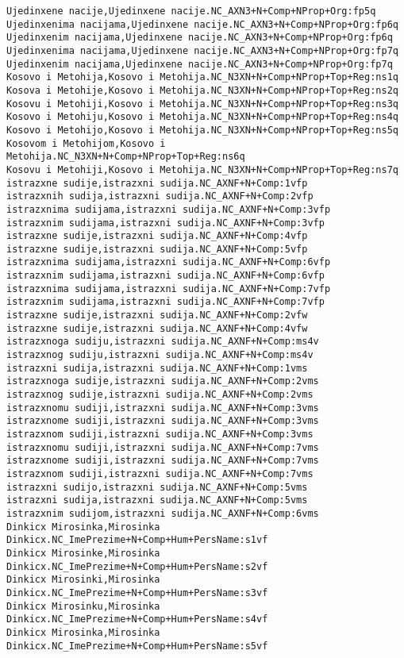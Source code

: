 \begin{verbatim}
Ujedinxene nacije,Ujedinxene nacije.NC_AXN3+N+Comp+NProp+Org:fp5q
Ujedinxenima nacijama,Ujedinxene nacije.NC_AXN3+N+Comp+NProp+Org:fp6q
Ujedinxenim nacijama,Ujedinxene nacije.NC_AXN3+N+Comp+NProp+Org:fp6q
Ujedinxenima nacijama,Ujedinxene nacije.NC_AXN3+N+Comp+NProp+Org:fp7q
Ujedinxenim nacijama,Ujedinxene nacije.NC_AXN3+N+Comp+NProp+Org:fp7q
Kosovo i Metohija,Kosovo i Metohija.NC_N3XN+N+Comp+NProp+Top+Reg:ns1q
Kosova i Metohije,Kosovo i Metohija.NC_N3XN+N+Comp+NProp+Top+Reg:ns2q
Kosovu i Metohiji,Kosovo i Metohija.NC_N3XN+N+Comp+NProp+Top+Reg:ns3q
Kosovo i Metohiju,Kosovo i Metohija.NC_N3XN+N+Comp+NProp+Top+Reg:ns4q
Kosovo i Metohijo,Kosovo i Metohija.NC_N3XN+N+Comp+NProp+Top+Reg:ns5q
Kosovom i Metohijom,Kosovo i Metohija.NC_N3XN+N+Comp+NProp+Top+Reg:ns6q
Kosovu i Metohiji,Kosovo i Metohija.NC_N3XN+N+Comp+NProp+Top+Reg:ns7q
istrazxne sudije,istrazxni sudija.NC_AXNF+N+Comp:1vfp
istrazxnih sudija,istrazxni sudija.NC_AXNF+N+Comp:2vfp
istrazxnima sudijama,istrazxni sudija.NC_AXNF+N+Comp:3vfp
istrazxnim sudijama,istrazxni sudija.NC_AXNF+N+Comp:3vfp
istrazxne sudije,istrazxni sudija.NC_AXNF+N+Comp:4vfp
istrazxne sudije,istrazxni sudija.NC_AXNF+N+Comp:5vfp
istrazxnima sudijama,istrazxni sudija.NC_AXNF+N+Comp:6vfp
istrazxnim sudijama,istrazxni sudija.NC_AXNF+N+Comp:6vfp
istrazxnima sudijama,istrazxni sudija.NC_AXNF+N+Comp:7vfp
istrazxnim sudijama,istrazxni sudija.NC_AXNF+N+Comp:7vfp
istrazxne sudije,istrazxni sudija.NC_AXNF+N+Comp:2vfw
istrazxne sudije,istrazxni sudija.NC_AXNF+N+Comp:4vfw
istrazxnoga sudiju,istrazxni sudija.NC_AXNF+N+Comp:ms4v
istrazxnog sudiju,istrazxni sudija.NC_AXNF+N+Comp:ms4v
istrazxni sudija,istrazxni sudija.NC_AXNF+N+Comp:1vms
istrazxnoga sudije,istrazxni sudija.NC_AXNF+N+Comp:2vms
istrazxnog sudije,istrazxni sudija.NC_AXNF+N+Comp:2vms
istrazxnomu sudiji,istrazxni sudija.NC_AXNF+N+Comp:3vms
istrazxnome sudiji,istrazxni sudija.NC_AXNF+N+Comp:3vms
istrazxnom sudiji,istrazxni sudija.NC_AXNF+N+Comp:3vms
istrazxnomu sudiji,istrazxni sudija.NC_AXNF+N+Comp:7vms
istrazxnome sudiji,istrazxni sudija.NC_AXNF+N+Comp:7vms
istrazxnom sudiji,istrazxni sudija.NC_AXNF+N+Comp:7vms
istrazxni sudijo,istrazxni sudija.NC_AXNF+N+Comp:5vms
istrazxni sudija,istrazxni sudija.NC_AXNF+N+Comp:5vms
istrazxnim sudijom,istrazxni sudija.NC_AXNF+N+Comp:6vms
Dinkicx Mirosinka,Mirosinka Dinkicx.NC_ImePrezime+N+Comp+Hum+PersName:s1vf
Dinkicx Mirosinke,Mirosinka Dinkicx.NC_ImePrezime+N+Comp+Hum+PersName:s2vf
Dinkicx Mirosinki,Mirosinka Dinkicx.NC_ImePrezime+N+Comp+Hum+PersName:s3vf
Dinkicx Mirosinku,Mirosinka Dinkicx.NC_ImePrezime+N+Comp+Hum+PersName:s4vf
Dinkicx Mirosinka,Mirosinka Dinkicx.NC_ImePrezime+N+Comp+Hum+PersName:s5vf

\end{verbatim}
